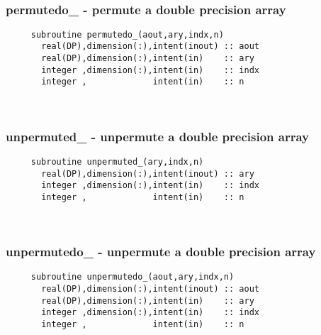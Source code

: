  
\mbox{}\hrulefill\ 
 
  \subsubsection{permutedo\_ - permute a double precision array}

\begin{verbatim} 
     subroutine permutedo_(aout,ary,indx,n)
       real(DP),dimension(:),intent(inout) :: aout
       real(DP),dimension(:),intent(in)    :: ary
       integer ,dimension(:),intent(in)    :: indx
       integer ,             intent(in)    :: n
 \end{verbatim}%
 
 
\mbox{}\hrulefill\ 
 
  \subsubsection{unpermuted\_ - unpermute a double precision array}

\begin{verbatim} 
     subroutine unpermuted_(ary,indx,n)
       real(DP),dimension(:),intent(inout) :: ary
       integer ,dimension(:),intent(in)    :: indx
       integer ,             intent(in)    :: n
 \end{verbatim}%
 
 
\mbox{}\hrulefill\ 

  \subsubsection{unpermutedo\_ - unpermute a double precision array}

\begin{verbatim} 
     subroutine unpermutedo_(aout,ary,indx,n)
       real(DP),dimension(:),intent(inout) :: aout
       real(DP),dimension(:),intent(in)    :: ary
       integer ,dimension(:),intent(in)    :: indx
       integer ,             intent(in)    :: n
 \end{verbatim}%
 
